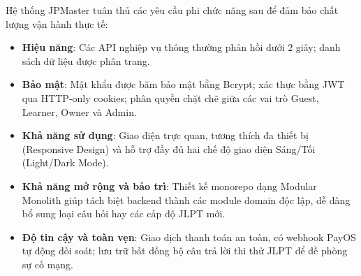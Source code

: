\documentclass[../DoAn.tex]{subfiles}
\begin{document}
Hệ thống JPMaster tuân thủ các yêu cầu phi chức năng sau để đảm bảo chất lượng vận hành thực tế:
\begin{itemize}
    \item \textbf{Hiệu năng}: Các API nghiệp vụ thông thường phản hồi dưới 2 giây; danh sách dữ liệu được phân trang.
    \item \textbf{Bảo mật}: Mật khẩu được băm bảo mật bằng Bcrypt; xác thực bằng JWT qua HTTP-only cookies; phân quyền chặt chẽ giữa các vai trò Guest, Learner, Owner và Admin.
    \item \textbf{Khả năng sử dụng}: Giao diện trực quan, tương thích đa thiết bị (Responsive Design) và hỗ trợ đầy đủ hai chế độ giao diện Sáng/Tối (Light/Dark Mode).
    \item \textbf{Khả năng mở rộng và bảo trì}: Thiết kế monorepo dạng Modular Monolith giúp tách biệt backend thành các module domain độc lập, dễ dàng bổ sung loại câu hỏi hay các cấp độ JLPT mới.
    \item \textbf{Độ tin cậy và toàn vẹn}: Giao dịch thanh toán an toàn, có webhook PayOS tự động đối soát; lưu trữ bất đồng bộ câu trả lời thi thử JLPT để đề phòng sự cố mạng.
\end{itemize}
\end{document}
